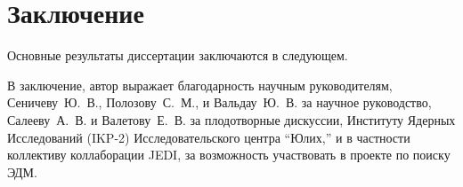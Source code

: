 \chapter*{Заключение}                       %


Основные результаты диссертации заключаются в следующем.


В заключение, автор выражает благодарность научным руководителям, Сеничеву~Ю.~В., Полозову~С.~М., и Вальдау~Ю.~В. за научное руководство, Салееву~А.~В. и Валетову~Е.~В. за плодотворные дискуссии, Институту Ядерных Исследований (IKP-2) Исследовательского центра ``Юлих,'' и в частности коллективу коллаборации JEDI, за возможность участвовать в проекте по поиску ЭДМ.
